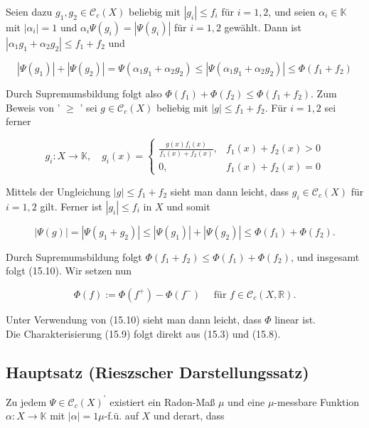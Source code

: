 \documentclass[10pt, letterpaper]{article}
\begin{document}
Seien dazu $g_{1}, g_{2} \in \mathcal{C}_{c}(X)$ beliebig mit $\left|g_{i}\right| \leq f_{i}$ für $i=1,2$, und seien $\alpha_{i} \in \mathbb{K}$ mit $\left|\alpha_{i}\right|=1$ und $\alpha_{i} \Psi\left(g_{i}\right)=\left|\Psi\left(g_{i}\right)\right|$ für $i=1,2$ gewählt. Dann ist $\left|\alpha_{1} g_{1}+\alpha_{2} g_{2}\right| \leq f_{1}+f_{2}$ und

$$
\left|\Psi\left(g_{1}\right)\right|+\left|\Psi\left(g_{2}\right)\right|=\Psi\left(\alpha_{1} g_{1}+\alpha_{2} g_{2}\right) \leq\left|\Psi\left(\alpha_{1} g_{1}+\alpha_{2} g_{2}\right)\right| \leq \Phi\left(f_{1}+f_{2}\right)
$$

Durch Supremumsbildung folgt also $\Phi\left(f_{1}\right)+\Phi\left(f_{2}\right) \leq \Phi\left(f_{1}+f_{2}\right)$. Zum Beweis von ' $\geq$ ' sei $g \in \mathcal{C}_{c}(X)$ beliebig mit $|g| \leq f_{1}+f_{2}$. Für $i=1,2$ sei ferner

$$
g_{i}: X \rightarrow \mathbb{K}, \quad g_{i}(x)= \begin{cases}\frac{g(x) f_{i}(x)}{f_{1}(x)+f_{2}(x)}, & f_{1}(x)+f_{2}(x)>0 \\ 0, & f_{1}(x)+f_{2}(x)=0\end{cases}
$$

Mittels der Ungleichung $|g| \leq f_{1}+f_{2}$ sieht man dann leicht, dass $g_{i} \in \mathcal{C}_{c}(X)$ für $i=1,2$ gilt. Ferner ist $\left|g_{i}\right| \leq f_{i}$ in $X$ und somit

$$
|\Psi(g)|=\left|\Psi\left(g_{1}+g_{2}\right)\right| \leq\left|\Psi\left(g_{1}\right)\right|+\left|\Psi\left(g_{2}\right)\right| \leq \Phi\left(f_{1}\right)+\Phi\left(f_{2}\right) .
$$

Durch Supremumsbildung folgt $\Phi\left(f_{1}+f_{2}\right) \leq \Phi\left(f_{1}\right)+\Phi\left(f_{2}\right)$, und insgesamt folgt (15.10). Wir setzen nun

$$
\Phi(f):=\Phi\left(f^{+}\right)-\Phi\left(f^{-}\right) \quad \text { für } f \in \mathcal{C}_{c}(X, \mathbb{R}) .
$$

Unter Verwendung von (15.10) sieht man dann leicht, dass $\Phi$ linear ist.\\
Die Charakterisierung (15.9) folgt direkt aus (15.3) und (15.8).

\subsection*{Hauptsatz (Rieszscher Darstellungssatz)}
Zu jedem $\Psi \in \mathcal{C}_{c}(X)^{\prime}$ existiert ein Radon-Maß $\mu$ und eine $\mu$-messbare Funktion $\alpha: X \rightarrow \mathbb{K}$ mit $|\alpha|=1 \mu$-f.ü. auf $X$ und derart, dass
\end{document}
